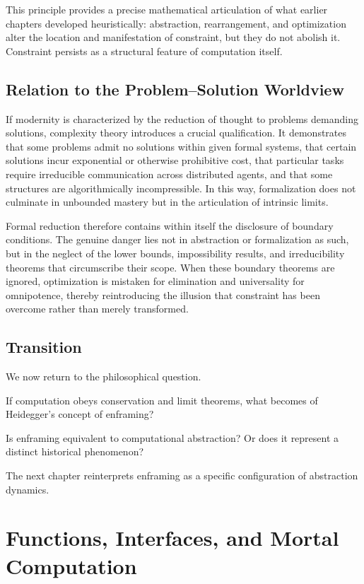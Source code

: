 \documentclass[11pt,openany]{book}
\begin{document}
\medskip

This principle provides a precise mathematical articulation of what earlier 
chapters developed heuristically: abstraction, rearrangement, and optimization 
alter the location and manifestation of constraint, but they do not abolish it. 
Constraint persists as a structural feature of computation itself.

\section{Relation to the Problem--Solution Worldview}

If modernity is characterized by the reduction of thought to problems demanding 
solutions, complexity theory introduces a crucial qualification. It demonstrates 
that some problems admit no solutions within given formal systems, that certain 
solutions incur exponential or otherwise prohibitive cost, that particular tasks 
require irreducible communication across distributed agents, and that some structures 
are algorithmically incompressible. In this way, formalization does not culminate in 
unbounded mastery but in the articulation of intrinsic limits.

Formal reduction therefore contains within itself the disclosure of boundary 
conditions. The genuine danger lies not in abstraction or formalization as such, 
but in the neglect of the lower bounds, impossibility results, and irreducibility 
theorems that circumscribe their scope. When these boundary theorems are ignored, 
optimization is mistaken for elimination and universality for omnipotence, 
thereby reintroducing the illusion that constraint has been overcome rather 
than merely transformed.

\section{Transition}

We now return to the philosophical question.

If computation obeys conservation and limit theorems,
what becomes of Heidegger's concept of enframing?

Is enframing equivalent to computational abstraction?
Or does it represent a distinct historical phenomenon?

The next chapter reinterprets enframing as a specific configuration of abstraction dynamics.

\chapter{Functions, Interfaces, and Mortal Computation}
\end{document}
